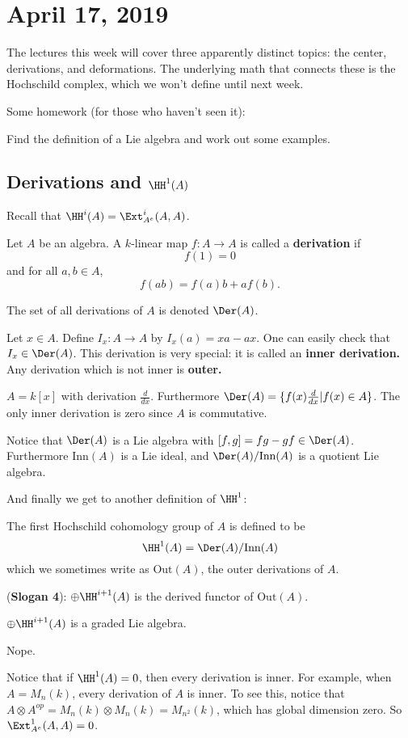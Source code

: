 \documentclass[12pt]{article}
\begin{document}
\section{April 17, 2019}
The lectures this week will cover three apparently distinct topics: the center, derivations, and deformations. The 
underlying math that connects these is the Hochschild complex, which we won't define until next week.

Some homework (for those who haven't seen it):
\begin{ex}
	Find the definition of a Lie algebra and work out some examples.
\end{ex}
\subsection{Derivations and $\HH^1(A)$}
Recall that $\HH^i(A)=\Ext_{A^e}^i(A,A)$.
\begin{defn}
	Let $A$ be an algebra. A $k$-linear map $f:A\to A$ is called a \textbf{derivation} if 
	\[f(1)=0\]
	and for all $a,b\in A$,
	\[f(ab)=f(a)b+af(b).\]

	The set of all derivations of $A$ is denoted $\Der(A)$.
\end{defn}
\begin{defn}
	Let $x\in A$. Define $I_x:A\to A$ by $I_x(a)=xa-ax$. One can easily check that $I_x\in\Der(A)$.
	This derivation is very special: it is called an \textbf{inner derivation.} Any derivation which is 
	not inner is \textbf{outer.}
\end{defn}
\begin{ex}
	$A=k[x]$ with derivation $\frac{d}{dx}$. Furthermore $\Der(A)=\{f(x)\frac{d}{dx}|f(x)\in A\}$. The only
	inner derivation is zero since $A$ is commutative.
\end{ex}
\begin{rmk}
	Notice that $\Der(A)$ is a Lie algebra with $[f,g]=fg-gf\in\Der(A)$. Furthermore $\text{Inn}(A)$ is a 
	Lie ideal, and $\Der(A)/\text{Inn}(A)$ is a quotient Lie algebra.
\end{rmk}
And finally we get to another definition of $\HH^1$:
\begin{defn}
	The first Hochschild cohomology group of $A$ is defined to be
	\[\HH^1(A)=\Der(A)/\text{Inn}(A)\]
	which we sometimes write as $\text{Out}(A)$, the outer derivations of $A$.
\end{defn}
\begin{rmk}
	(\textbf{Slogan 4}): $\oplus\HH^{i+1}(A)$ is the derived functor of $\text{Out}(A)$.
\end{rmk}
\begin{thm}
	$\oplus\HH^{i+1}(A)$ is a graded Lie algebra.
\end{thm}
\begin{prf}
	Nope.
\end{prf}
\begin{rmk}
	Notice that if $\HH^1(A)=0$, then every derivation is inner. For example, when 
	$A=M_n(k)$, every derivation of $A$ is inner. To see this, notice that $A\otimes A^{op}=M_n(k)\otimes M_n(k)=M_{n^2}(k)$,
	which has global dimension zero. So $\Ext_{A^e}^1(A,A)=0$.
\end{rmk}
\end{document}
